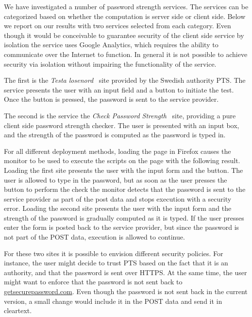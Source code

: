 \documentclass{llncs}
\begin{document}
We have investigated a number of password strength services. The services can
be categorized based on whether the computation is server side or client side.
Below we report on our results with two services selected from each category. 
Even though it would be conceivable to guarantee security of the client side service
by isolation the service uses Google Analytics, which requires the ability
to communicate over the Internet to function. In general it is not possible
to achieve security via isolation without impairing the functionality of
the service.

The first is the \emph{Testa losenord}~\cite{pts} site provided by
the Swedish authority PTS. The service presents the user with an input field
and a button to initiate the test. Once the button is pressed, the
password is sent to the service provider.

The second is the service the \emph{Check Password Strength}~\cite{GSP} site, providing a pure
client side password strength checker. The user is presented with an
input box, and the strength of the password is computed as the password
is typed in.
%


For all different deployment methods, loading the page in Firefox causes the monitor
to be used to execute the scripts on the page with the following result.
%
Loading the first site presents the user with the input form and the button.
The user is allowed to type in the password, but as soon as the user presses
the button to perform the check the monitor detects that the password is sent
to the service provider as part of the post data and stops execution with a
security error.
%
Loading the second site presents the user with the input form and the strength
of the password is gradually computed as it is typed. If the user presses enter
the form is posted back to the service provider, but since the password is not
part of the POST data, execution is allowed to continue. 

For these two sites it is possible to envision different security policies. 
For instance, the user might decide to trust PTS based on the fact that it
is an authority, and that the password is sent over HTTPS. At the same time,
the user might want to enforce that the password is not sent back to
\url{getsecurepassword.com}. Even though the password is not sent back in the
current version, a small change would include it in the POST data and
send it in cleartext.
\end{document}
